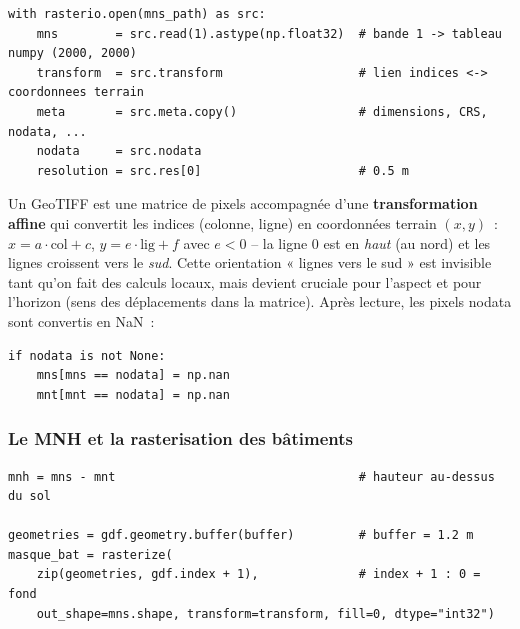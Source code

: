 \documentclass[11pt,a4paper]{article}
\begin{document}
\begin{lstlisting}
with rasterio.open(mns_path) as src:
    mns        = src.read(1).astype(np.float32)  # bande 1 -> tableau numpy (2000, 2000)
    transform  = src.transform                   # lien indices <-> coordonnees terrain
    meta       = src.meta.copy()                 # dimensions, CRS, nodata, ...
    nodata     = src.nodata
    resolution = src.res[0]                      # 0.5 m
\end{lstlisting}

Un GeoTIFF est une matrice de pixels accompagnée d'une \textbf{transformation
affine} qui convertit les indices (colonne, ligne) en coordonnées terrain
$(x, y)$~: $x = a\cdot\text{col} + c$, $y = e\cdot\text{lig} + f$ avec $e < 0$
-- la ligne 0 est en \emph{haut} (au nord) et les lignes croissent vers le
\emph{sud}. Cette orientation « lignes vers le sud » est invisible tant qu'on
fait des calculs locaux, mais devient cruciale pour l'aspect et pour l'horizon
(sens des déplacements dans la matrice). Après lecture, les pixels nodata sont
convertis en NaN~:

\begin{lstlisting}
if nodata is not None:
    mns[mns == nodata] = np.nan
    mnt[mnt == nodata] = np.nan
\end{lstlisting}

\subsubsection{Le MNH et la rasterisation des bâtiments}

\begin{lstlisting}
mnh = mns - mnt                                  # hauteur au-dessus du sol

geometries = gdf.geometry.buffer(buffer)         # buffer = 1.2 m
masque_bat = rasterize(
    zip(geometries, gdf.index + 1),              # index + 1 : 0 = fond
    out_shape=mns.shape, transform=transform, fill=0, dtype="int32")
\end{lstlisting}
\end{document}
